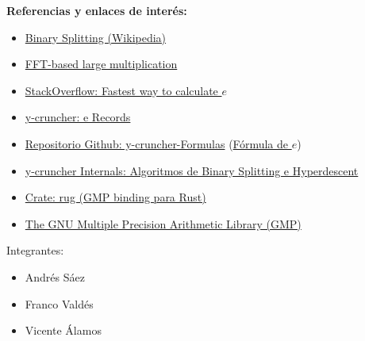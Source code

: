 \documentclass[12pt]{article}
\begin{document}
\vspace{0.5cm}
\textbf{Referencias y enlaces de interés:}
\begin{itemize}
    \item \href{https://en.wikipedia.org/wiki/Binary_splitting}{Binary Splitting (Wikipedia)}
    \item \href{http://numbers.computation.free.fr/Constants/Algorithms/fft.html}{FFT-based large multiplication}
    \item \href{https://stackoverflow.com/questions/13313933/what-is-the-fastest-way-to-calculate-e-to-2-trillion-digits/13317331#13317331}{StackOverflow: Fastest way to calculate $e$}
    \item \href{https://www.numberworld.org/digits/E/}{y-cruncher: e Records}
    \item \href{https://github.com/Mysticial/y-cruncher-Formulas}{Repositorio Github: y-cruncher-Formulas} (\href{https://github.com/Mysticial/y-cruncher-Formulas/blob/master/Official\%20Formulas/e\%20-\%20exp(1).cfg}{Fórmula de $e$})
    \item \href{https://www.numberworld.org/y-cruncher/internals/binary-splitting.html}{y-cruncher Internals: Algoritmos de Binary Splitting e Hyperdescent}
    \item \href{https://crates.io/crates/rug}{Crate: rug (GMP binding para Rust)}
    \item \href{https://gmplib.org/}{The GNU Multiple Precision Arithmetic Library (GMP)}
\end{itemize}
\vspace{.3in}
\hfill
\begin{minipage}{0.35\textwidth}
Integrantes:
\begin{itemize}
    \item Andrés Sáez
    \item Franco Valdés
    \item Vicente Álamos
\end{itemize}
\end{minipage}
\end{document}
